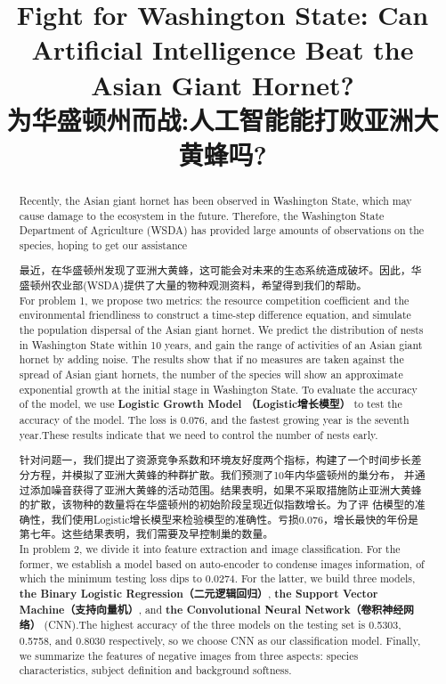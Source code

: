 \documentclass[12pt]{ctexart}
\title{Fight for Washington State: Can Artificial Intelligence Beat the Asian Giant Hornet?\\为华盛顿州而战:人工智能能打败亚洲大黄蜂吗?}
\begin{document}
\maketitle
\begin{abstract}
Recently, the Asian giant hornet has been observed in Washington State, which may cause damage to the ecosystem in the future. Therefore, 
the Washington State Department of Agriculture (WSDA) has provided large amounts of observations on the species, hoping to get our assistance

最近，在华盛顿州发现了亚洲大黄蜂，这可能会对未来的生态系统造成破坏。因此，华盛顿州农业部(WSDA)提供了大量的物种观测资料，希望得到我们的帮助。\\

For problem 1, we propose two metrics: the resource competition coefficient and the environmental friendliness to construct a time-step 
difference equation, and simulate the population dispersal of the Asian giant hornet. We predict the distribution of nests in Washington
 State within 10 years, and gain the range of activities of an Asian giant hornet by adding noise. The results show that if no measures 
 are taken against the spread of Asian giant hornets, the number of the species will show an approximate exponential growth at the initial 
 stage in Washington State. To evaluate the accuracy of the model, we use \textbf{Logistic Growth Model （Logistic增长模型）} to test the accuracy of the model. The loss 
 is 0.076, and the fastest growing year is the seventh year.These results indicate that we need to control the number of nests early.

针对问题一，我们提出了资源竞争系数和环境友好度两个指标，构建了一个时间步长差分方程，并模拟了亚洲大黄蜂的种群扩散。我们预测了10年内华盛顿州的巢分布，
并通过添加噪音获得了亚洲大黄蜂的活动范围。结果表明，如果不采取措施防止亚洲大黄蜂的扩散，该物种的数量将在华盛顿州的初始阶段呈现近似指数增长。为了评
估模型的准确性，我们使用Logistic增长模型来检验模型的准确性。亏损0.076，增长最快的年份是第七年。这些结果表明，我们需要及早控制巢的数量。\\

In problem 2, we divide it into feature extraction and image classification. For the former, we establish a model based on auto-encoder to 
condense images information, of which the minimum testing loss dips to 0.0274. For the latter, we build three models, \textbf{the Binary Logistic 
Regression（二元逻辑回归）}, \textbf{the Support Vector Machine（支持向量机）}, and \textbf{the Convolutional Neural Network（卷积神经网络）} (CNN).The highest accuracy of the three models on the testing 
set is 0.5303, 0.5758, and 0.8030 respectively, so we choose CNN as our classification model. Finally, we summarize the features of negative 
images from three aspects: species characteristics, subject definition and background softness.


\end{abstract}
\end{document}
